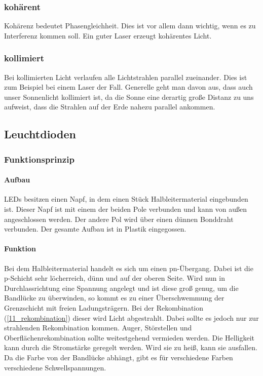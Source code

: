 	\subsubsection{kohärent} 
	Kohärenz bedeutet Phasengleichheit. Dies ist vor allem dann wichtig, wenn es zu Interferenz kommen soll. Ein guter Laser erzeugt kohärentes Licht. 
	\subsubsection{kollimiert}
	Bei kollimierten Licht verlaufen alle Lichtstrahlen parallel zueinander. Dies ist zum Beispiel bei einem Laser der Fall. Generelle geht man davon aus, dass auch unser Sonnenlicht kollimiert ist, da die Sonne eine derartig große Distanz zu uns aufweist, dass die Strahlen auf der Erde nahezu parallel ankommen.


\subsection{Leuchtdioden}
	\subsubsection{Funktionsprinzip}
	
	\paragraph{Aufbau} LEDs besitzen einen Napf, in dem einen Stück Halbleitermaterial eingebunden ist. Dieser Napf ist mit einem der beiden Pole verbunden und kann von außen angeschlossen werden. Der andere Pol wird über einen dünnen Bonddraht verbunden. Der gesamte Aufbau ist in Plastik eingegossen.
	
	\paragraph{Funktion} Bei dem Halbleitermaterial handelt es sich um einen pn-Übergang. Dabei ist die p-Schicht sehr löcherreich, dünn und auf der oberen Seite. Wird nun in Durchlassrichtung eine Spannung angelegt und ist diese groß genug, um die Bandlücke zu überwinden, so kommt es zu einer Überschwemmung der Grenzschicht mit freien Ladungsträgern. Bei der Rekombination (\ref{11_rekombination}) dieser wird Licht abgestrahlt. Dabei sollte es jedoch nur zur strahlenden Rekombination kommen. Auger, Störstellen und Oberflächenrekombination sollte weitestgehend vermieden werden. Die Helligkeit kann durch die Stromstärke geregelt werden. Wird sie zu heiß, kann sie ausfallen. Da die Farbe von der Bandlücke abhängt, gibt es für verschiedene Farben verschiedene Schwellspannungen.
	
